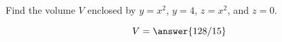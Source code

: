 \documentclass{ximera}
\author{David Guichard \and Neal Koblitz \and H. Jerome Keisler \and Albert Scheller \and Barry Balof \and Mike Wills \and Matthew Carr}
\begin{document}
\begin{exercise}




Find the volume $V$ enclosed by $y=x^2$, $y=4$, $z=x^2$, and $z=0$.

\begin{prompt}
\[
V=\answer{128/15}
\]
\end{prompt}



\end{exercise}
\end{document}
